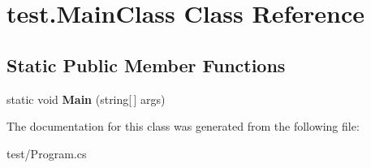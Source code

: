 \hypertarget{classtest_1_1MainClass}{\section{test.\-Main\-Class Class Reference}
\label{classtest_1_1MainClass}
}
\subsection*{Static Public Member Functions}
\begin{DoxyCompactItemize}
\item 
\hypertarget{classtest_1_1MainClass_a4679ef28a1326b8af55f556b1b0e94a7}{static void {\bfseries Main} (string\mbox{[}$\,$\mbox{]} args)}\label{classtest_1_1MainClass_a4679ef28a1326b8af55f556b1b0e94a7}

\end{DoxyCompactItemize}


The documentation for this class was generated from the following file\-:\begin{DoxyCompactItemize}
\item 
test/Program.\-cs\end{DoxyCompactItemize}
